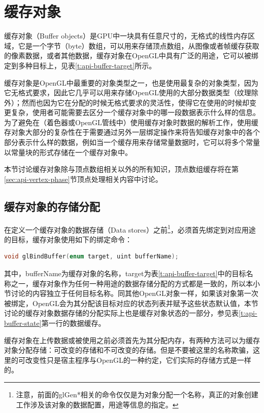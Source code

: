 \section{缓存对象}\label{sec:api-buffer-object}
缓存对象（Buffer objects）是GPU中一块具有任意尺寸的，无格式的线性内存区域，它是一个字节（byte）数组，可以用来存储顶点数组，从图像或者帧缓存获取的像素数据，或者其他数据，缓存对象在OpenGL中具有广泛的用途，它可以被绑定到多种目标上，见表\ref{t:api-buffer-target}所示。

缓存对象是OpenGL中最重要的对象类型之一，也是使用最复杂的对象类型，因为它无格式要求，因此它几乎可以用来存储OpenGL使用的大部分数据类型（纹理除外）；然而也因为它在分配的时候无格式要求的灵活性，使得它在使用的时候却变更复杂，使用者可能需要去区分一个缓存对象中的哪一段数据表示什么样的信息。为了避免在（着色器或OpenGL管线中）使用缓存对象时数据的解析工作，使用缓存对象大部分的复杂性在于需要通过另外一层绑定操作来将告知缓存对象中的各个部分表示什么样的数据，例如当一个缓存用来存储常量数据时，它可以将多个常量以常量块的形式存储在一个缓存对象中。

本节讨论缓存对象除与顶点数组相关以外的所有知识，顶点数组缓存将在第\ref{sec:api-vertex-phase}节顶点处理相关内容中讨论。




\subsection{缓存对象的存储分配}\label{sec:api-buffer-storage}
在定义一个缓存对象的数据存储（Data stores）之前\footnote{注意，前面的glGen*相关的命令仅仅是为对象分配一个名称，真正的对象创建工作涉及该对象的数据配置，用途等信息的指定。}，必须首先绑定到对应用途的目标，缓存对象使用如下的绑定命令：

\begin{lstlisting}[language=C++]
void glBindBuffer​(enum target, uint bufferName);
\end{lstlisting}

其中，bufferName为缓存对象的名称，target为表\ref{t:api-buffer-target}中的目标名称之一，缓存对象作为任何一种用途的数据存储分配的方式都是一致的，所以本小节讨论的内容独立于任何目标名称。同其他OpenGL对象一样，如果该对象第一次被绑定，OpenGL会为其分配该目标对应的状态列表并赋予这些状态默认值，本节讨论的缓存对象数据存储的分配实际上也是缓存对象状态的一部分，参见表\ref{t:api-buffer-state}第一行的数据缓存。

缓存对象在上传数据或被使用之前必须首先为其分配内存，有两种方法可以为缓存对象分配存储：可改变的存储和不可改变的存储。但是不要被这里的名称欺骗，这里的可改变性只是宿主程序与OpenGL的一种约定，它们实际的存储方式是一样的。



